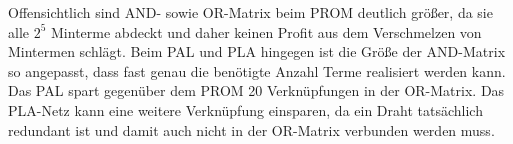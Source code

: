 \documentclass{CInf_practice}
\begin{document}
Offensichtlich sind AND- sowie OR-Matrix beim PROM deutlich größer, da sie alle
$2^5$ Minterme abdeckt und daher keinen Profit aus dem Verschmelzen von
Mintermen schlägt. Beim PAL und PLA hingegen ist die Größe der AND-Matrix
so angepasst, dass fast genau die benötigte Anzahl Terme realisiert werden kann. Das
PAL spart gegenüber dem PROM 20 Verknüpfungen in der OR-Matrix. Das PLA-Netz
kann eine weitere Verknüpfung einsparen, da ein Draht tatsächlich redundant ist
und damit auch nicht in der OR-Matrix verbunden werden muss.
\end{document}
